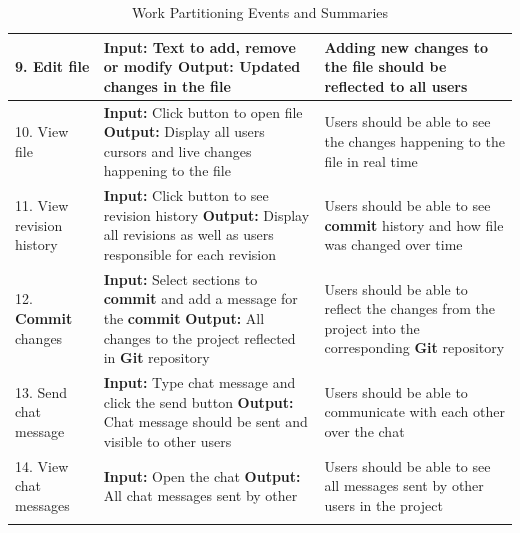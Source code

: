 \documentclass[12pt, titlepage]{article}
\begin{document}
\begin{longtable}{|p{4cm}|p{5cm}|p{5cm}|}
		\hline
		9. Edit file  & \textbf{Input:} Text to add, remove or modify \newline \textbf{Output:} Updated changes in the file &  Adding new changes to the file should be reflected to all users\\
		\hline
		10. View file & \textbf{Input:} Click button to open file \newline \textbf{Output:} Display all users cursors and live changes happening to the file &  Users should be able to see the changes happening to the file in real time\\
		\hline
		11. View revision history & \textbf{Input:} Click button to see revision history \newline \textbf{Output:} Display all revisions as well as users responsible for each revision &  Users should be able to see \textbf{commit} history and how file was changed over time\\
		\hline
		12. \textbf{Commit} changes & \textbf{Input:} Select sections to \textbf{commit} and add a message for the \textbf{commit} \newline \textbf{Output:} All changes to the project reflected in \textbf{Git} repository &  Users should be able to reflect the changes from the project into the corresponding \textbf{Git} repository\\
		\hline
		13. Send chat message & \textbf{Input:} Type chat message and click the send button \newline \textbf{Output:} Chat message should be sent and visible to other users &  Users should be able to communicate with each other over the chat\\
		\hline
		14. View chat messages & \textbf{Input:} Open the chat \newline \textbf{Output:} All chat messages sent by other &  Users should be able to see all messages sent by other users in the project\\
		\hline
		\caption{Work Partitioning Events and Summaries}
	\end{longtable}
\end{document}
